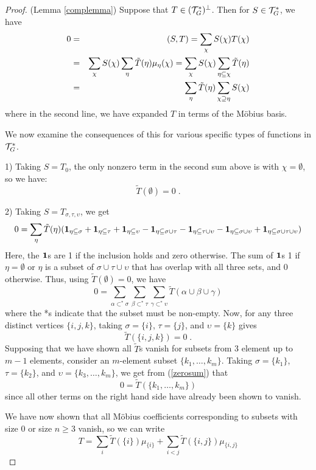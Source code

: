 \documentclass[12pt]{article}
\theoremstyle{definition}
\begin{document}
\begin{proof} (Lemma \ref{complemma})
Suppose that $T \in ({\cal T}_G^*)^\perp$. Then for $S \in {\cal T}_G^*$, we have 
    \begin{eqnarray*}
    0 &=& (S,T) = \sum_\chi S(\chi) T(\chi) \cr
    &=& \sum_\chi S (\chi) \sum_\eta \tilde{T}(\eta) \mu_\eta(\chi) = \sum_\chi S (\chi) \sum_{\eta \subseteq \chi} \tilde{T}(\eta) \cr
     &=&  \sum_\eta \tilde{T}(\eta) \sum_{\chi \supseteq \eta} S (\chi) \cr
    \end{eqnarray*}
where in the second line, we have expanded $T$ in terms of the Möbius basis. 

We now examine the consequences of this for various specific types of functions in ${\cal T}_G^*$.

1) Taking $S = T_0$, the only nonzero term in the second sum above is with $\chi = \emptyset$, so we have:
\[
\tilde{T}(\emptyset) = 0 \; .
\]

2) Taking $S = T_{\sigma, \tau ,\upsilon}$, we get 
\[
0 =  \sum_\eta \tilde{T}(\eta) ({\bf 1}_{\eta \subseteq  \sigma}+ {\bf 1}_{\eta \subseteq  \tau} + {\bf 1}_{\eta \subseteq  \upsilon} - {\bf 1}_{\eta \subseteq  \sigma \cup \tau } -{\bf 1}_{\eta \subseteq \tau \cup \upsilon} - {\bf 1}_{\eta \subseteq  \sigma \cup \upsilon} +
{\bf 1}_{\eta \subseteq  \sigma \cup \tau \cup \upsilon} )
\]
Here, the ${\bf 1}$s are 1 if the inclusion holds and zero otherwise. The sum of ${\bf 1}$s 1 if $\eta = \emptyset$ or $\eta$ is a subset of $\sigma \cup \tau \cup \upsilon$ that has overlap with all three sets, and 0 otherwise. Thus, using $\tilde{T}(\emptyset) = 0$, we have
\begin{equation}
\label{zerosum}
0 =  \sum_{\alpha \subset^* \sigma} \sum_{\beta \subset^* \tau} \sum_{\gamma \subset^* \upsilon} \tilde{T}(\alpha \cup \beta \cup \gamma)
\end{equation}
where the *s indicate that the subset must be non-empty.
Now, for any three distinct vertices $\{i,j,k\}$, taking $\sigma=\{i\}$, $\tau = \{j\}$, and $\upsilon = \{k\}$ gives 
\[
\tilde{T}(\{i,j,k\}) = 0 \; .
\]
Supposing that we have shown all $\tilde{T}$s vanish for subsets from 3 element up to $m-1$ elements, consider an $m$-element subset $\{k_1, \dots, k_m\}$. Taking $\sigma=\{k_1\}$, $\tau = \{k_2\}$, and $\upsilon = \{k_3, \dots, k_m\}$, we get from (\ref{zerosum}) that 
\[
0 = \tilde{T}(\{k_1, \dots, k_m\}) 
\]
since all other terms on the right hand side have already been shown to vanish. 

We have now shown that all Möbius coefficients corresponding to subsets with size 0 or size $n \ge 3$ vanish, so we can write
\begin{equation}
\label{shortsum}
T = \sum_i \tilde{T}(\{i\}) \mu_{\{i\}} +\sum_{i < j} \tilde{T}(\{i,j\}) \mu_{\{i,j\}}
\end{equation}


\end{proof}
\end{document}
